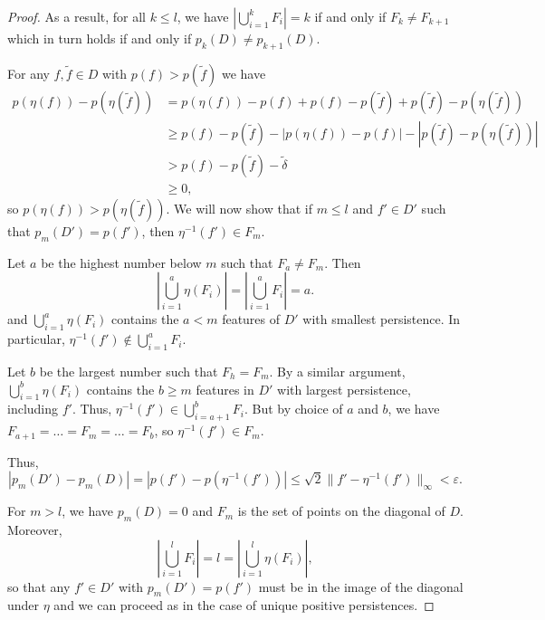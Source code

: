 \documentclass[10pt,a4paper]{amsart}
\begin{document}
\begin{proof}
    As a result, for all $k\leq l$, we have $|\bigcup_{i=1}^{k} F_i |= k$ if and only if $F_k \neq F_{k+1}$ which in turn holds if and only if $p_k(D) \neq p_{k+1}(D)$.

    For any $f, \tilde{f} \in D$ with $p(f) > p(\tilde{f})$ we have 
    \begin{align}
        p(\eta(f))- p(\eta(\tilde{f})) &= p(\eta(f))-p(f) + p(f) - p(\tilde{f}) + p(\tilde{f}) - p(\eta(\tilde{f})) \nonumber \\
        &\geq p(f) - p(\tilde{f}) - | p(\eta(f))-p(f)| - |p(\tilde{f}) - p(\eta(\tilde{f}))| \nonumber \\
        &> p(f) - p(\tilde{f}) - \tilde{\delta}\nonumber \\
        &\geq 0,
    \end{align}
    so $p(\eta(f)) > p(\eta(\tilde{f}))$. We will now show that if $m\leq l$  and $f'\in D'$ such that $p_m(D') = p(f')$, then $\eta^{-1}(f') \in F_m$.

    Let $a$ be the highest number below $m$ such that $F_a\neq F_m$. Then 
    $$
    \left|\bigcup_{i=1}^a \eta(F_i)\right| = \left|\bigcup_{i=1}^a F_i\right| = a.
    $$
    and $\bigcup_{i=1}^a \eta(F_i)$ contains the $a<m$ features of $D'$ with smallest persistence. In particular, \mbox{$\eta^{-1}(f') \notin \bigcup_{i=1}^a F_i$.}

    Let $b$ be the largest number such that $F_h = F_m$. By a similar argument, $\bigcup_{i=1}^b \eta(F_i)$ contains the $b\geq m$ features in $D'$ with largest persistence, including $f'$. Thus,  $\eta^{-1}(f')\in \bigcup_{i=a+1}^{b} F_i$. But by choice of $a$ and $b$, we have $F_{a+1} = \dots = F_m=\dots =F_b$, so $\eta^{-1}(f')\in F_m$.

    Thus, 
    $$
    |p_m(D') - p_m(D)| = |p(f') - p(\eta^{-1}(f'))| \leq \sqrt{2} \|f'-\eta^{-1}(f')\|_{\infty} < \varepsilon.
    $$

    For $m> l$, we have $p_m(D)=0$ and $F_m$ is the set of points on the diagonal of $D$. Moreover, 
    $$\left|\bigcup_{i=1}^l F_i\right| = l = \left|\bigcup_{i=1}^l \eta(F_i)\right|,$$
    so that any $f'\in D'$ with $p_m(D') = p(f')$ must be in the image of the diagonal under $\eta$ and we can proceed as in the case of unique positive persistences.
\end{proof}
\end{document}
